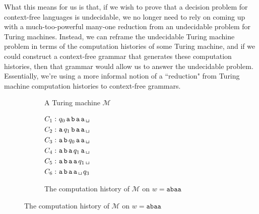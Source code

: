 What this means for us is that, if we wish to prove that a decision problem for context-free languages is undecidable, we no longer need to rely on coming up with a much-too-powerful many-one reduction from an undecidable problem for Turing machines. Instead, we can reframe the undecidable Turing machine problem in terms of the computation histories of some Turing machine, and if we could construct a context-free grammar that generates these computation histories, then that grammar would allow us to answer the undecidable problem. Essentially, we're using a more informal notion of a ``reduction" from Turing machine computation histories to context-free grammars.

\begin{figure}[t]
\centering
\begin{subfigure}[b]{0.5\textwidth}
\centering
{}
\caption{A Turing machine $\mathcal{M}$}
\label{subfig:TMcomputationhistorymachine}
\end{subfigure}
\hspace{0.5em}
\begin{subfigure}[b]{0.45\textwidth}
\centering
\captionsetup{width=.7\linewidth}
$ \begin{aligned}
C_{1}: \ & q_{0} \, \texttt{a} \, \texttt{b} \, \texttt{a} \, \texttt{a} \, \blankspace \\
C_{2}: \ & \texttt{a} \, q_{1} \, \texttt{b} \, \texttt{a} \, \texttt{a} \, \blankspace \\
C_{3}: \ & \texttt{a} \, \texttt{b} \, q_{0} \, \texttt{a} \, \texttt{a} \, \blankspace \\
C_{4}: \ & \texttt{a} \, \texttt{b} \, \texttt{a} \, q_{1} \, \texttt{a} \, \blankspace \\
C_{5}: \ & \texttt{a} \, \texttt{b} \, \texttt{a} \, \texttt{a} \, q_{1} \, \blankspace \\
C_{6}: \ & \texttt{a} \, \texttt{b} \, \texttt{a} \, \texttt{a} \, \blankspace \, q_{3}
\end{aligned} $
\caption{The computation history of $\mathcal{M}$ on $w = \texttt{abaa}$}
\label{subfig:TMcomputationhistorylist}
\end{subfigure}


\end{figure}
